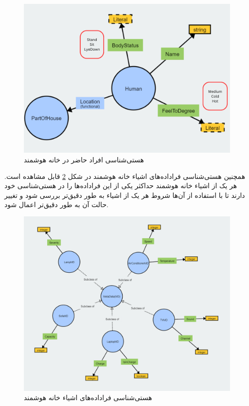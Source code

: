 \begin{itemize}
\begin{figure}[htp]
\centerline{\includegraphics[width=1\textwidth]{figs/f403.png}}
\caption{هستی‌شناسی افراد حاضر در خانه هوشمند}
\label{fig:f403}
\end{figure}

همچنین هستی‌شناسی فراداده‌های اشیاء خانه هوشمند در شکل \ref{fig:f402_metadata} قابل مشاهده است. هر یک از اشیاء خانه هوشمند حداکثر یکی از این فراداده‌ها را در هستی‌شناسی خود دارند تا با استفاده از آن‌ها شروط هر یک از اشیاء به طور دقیق‌تر بررسی شود و تغییر حالت آن به طور دقیق‌تر اعمال شود.

\begin{figure}[htp]
\centerline{\includegraphics[width=1\textwidth]{figs/f402_metadata.png}}
\caption{هستی‌شناسی فراداده‌های اشیاء خانه هوشمند} 
\label{fig:f402_metadata}
\end{figure}


\end{itemize}
